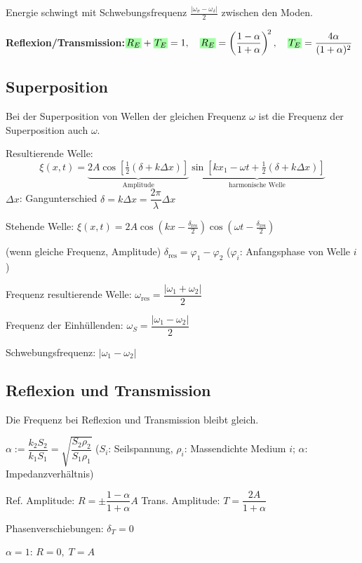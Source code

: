 \documentclass[10pt,a4paper]{article}
\newcommand{\fl}[2]{%
  \noindent #1\hfill$\displaystyle #2$\par\vspace{1pt}}
\newcommand{\yhbox}[1]{%
  \par\vspace{2pt}\noindent%
  \colorbox{yellow!35}{\parbox{\dimexpr\linewidth-2\fboxsep\relax}{\small#1}}%
  \par\vspace{2pt}}
\newcommand{\ec}[1]{{\setlength\fboxsep{1pt}\colorbox{green!35}{\ensuremath{#1}}}}
\begin{document}
\begin{multicols}{2}
Energie schwingt mit Schwebungsfrequenz $\tfrac{|\omega_\sigma-\omega_\delta|}{2}$ zwischen den Moden.

\fl{\textbf{Reflexion/Transmission:}}{\ec{R_E}+\ec{T_E}=1,\quad \ec{R_E}=\left(\dfrac{1-\alpha}{1+\alpha}\right)^{\!2},\quad \ec{T_E}=\dfrac{4\alpha}{(1+\alpha)^2}}

\subsection{Superposition}

\yhbox{Bei der Superposition von Wellen der gleichen Frequenz $\omega$ ist die Frequenz der Superposition auch $\omega$.}

Resultierende Welle:
\[
  \xi(x,t)=\underbrace{2A\cos\!\left[\tfrac{1}{2}(\delta+k\Delta x)\right]}_{\text{Amplitude}}\underbrace{\sin\!\left[kx_1-\omega t+\tfrac{1}{2}(\delta+k\Delta x)\right]}_{\text{harmonische Welle}}
\]
$\Delta x$: Gangunterschied \quad $\delta=k\Delta x=\dfrac{2\pi}{\lambda}\Delta x$

Stehende Welle:
$\boxed{\xi(x,t)=2A\cos\!\left(kx-\tfrac{\delta_{\text{res}}}{2}\right)\cos\!\left(\omega t-\tfrac{\delta_{\text{res}}}{2}\right)}$

(wenn gleiche Frequenz, Amplitude) \quad $\delta_{\text{res}}=\varphi_1-\varphi_2$ \quad ($\varphi_i$: Anfangsphase von Welle $i$)

Frequenz resultierende Welle: $\boxed{\omega_{\text{res}}=\dfrac{|\omega_1+\omega_2|}{2}}$

Frequenz der Einhüllenden: $\boxed{\omega_S=\dfrac{|\omega_1-\omega_2|}{2}}$

Schwebungsfrequenz: $|\omega_1-\omega_2|$

\subsection{Reflexion und Transmission}

\yhbox{Die Frequenz bei Reflexion und Transmission bleibt gleich.}

$\boxed{\alpha:=\dfrac{k_2 S_2}{k_1 S_1}=\sqrt{\dfrac{S_2\rho_2}{S_1\rho_1}}}$ \quad ($S_i$: Seilspannung, $\rho_i$: Massendichte Medium $i$; $\alpha$: Impedanzverhältnis)

Ref. Amplitude: $\boxed{R=\pm\dfrac{1-\alpha}{1+\alpha}A}$ \quad Trans. Amplitude: $\boxed{T=\dfrac{2A}{1+\alpha}}$

Phasenverschiebungen: $\boxed{\delta_T=0}$

$\alpha=1$: $\boxed{R=0,\;T=A}$


\end{multicols}
\end{document}
